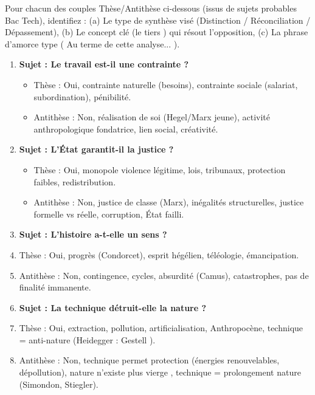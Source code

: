\documentclass[11pt]{article}
\begin{document}
\begin{exercice}
Pour chacun des couples Thèse/Antithèse ci-dessous (issus de sujets probables Bac Tech), identifiez : (a) Le type de synthèse visé (Distinction / Réconciliation / Dépassement), (b) Le concept clé (le \og{} tiers \fg{}) qui résout l'opposition, (c) La phrase d'amorce type (\og{} Au terme de cette analyse... \fg{}).

\begin{enumerate}
    \item \textbf{Sujet : \og{} Le travail est-il une contrainte ? \fg{}}
        \begin{itemize}
            \item Thèse : Oui, contrainte naturelle (besoins), contrainte sociale (salariat, subordination), pénibilité.
            \item Antithèse : Non, réalisation de soi (Hegel/Marx jeune), activité anthropologique fondatrice, lien social, créativité.
        \end{itemize}
    \item \textbf{Sujet : \og{} L'État garantit-il la justice ? \fg{}}
        \begin{itemize}
            \item Thèse : Oui, monopole violence légitime, lois, tribunaux, protection faibles, redistribution.
            \item Antithèse : Non, justice de classe (Marx), inégalités structurelles, justice formelle vs réelle, corruption, État failli.
        \end{itemize}
    \item \textbf{Sujet : \og{} L'histoire a-t-elle un sens ? \fg{}}
        \item Thèse : Oui, progrès (Condorcet), esprit hégélien, téléologie, émancipation.
        \item Antithèse : Non, contingence, cycles, absurdité (Camus), catastrophes, pas de finalité immanente.
    \item \textbf{Sujet : \og{} La technique détruit-elle la nature ? \fg{}}
        \item Thèse : Oui, extraction, pollution, artificialisation, Anthropocène, technique = anti-nature (Heidegger : \og{} Gestell \fg{}).
        \item Antithèse : Non, technique permet protection (énergies renouvelables, dépollution), nature n'existe plus \og{} vierge \fg{}, technique = prolongement nature (Simondon, Stiegler).
\end{enumerate}
\end{exercice}
\end{document}
